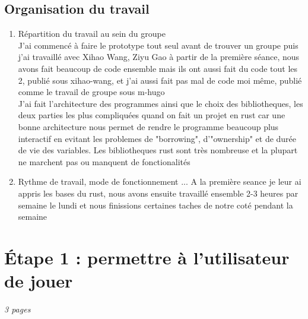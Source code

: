 \documentclass[a4paper]{article}
\begin{document}
\subsection{Organisation du travail}

\begin{enumerate}           %
\item
  Répartition du travail au sein du groupe\\
  J'ai commencé à faire le prototype tout seul avant de trouver un groupe puis j'ai travaillé avec Xihao Wang, Ziyu Gao à partir de la première séance, nous avons fait beaucoup de code ensemble mais ils ont aussi fait du code tout les 2, publié sous xihao-wang, et j'ai aussi fait pas mal de code moi même, publié comme le travail de groupe sous m-hugo\\
  J'ai fait l'architecture des programmes ainsi que le choix des bibliotheques, les deux parties les plus compliquées quand on fait un projet en rust car une bonne architecture nous permet de rendre le programme beaucoup plus interactif en evitant les problemes de "borrowing", d'"ownership" et de durée de vie des variables.
  Les bibliotheques rust sont très nombreuse et la plupart ne marchent pas ou manquent de fonctionalités 
\item
  Rythme de travail, mode de fonctionnement ...
  A la première seance je leur ai appris les bases du rust, nous avons ensuite travaillé ensemble 2-3 heures par semaine le lundi et nous finissions certaines taches de notre coté pendant la semaine
\end{enumerate}
\section{Étape 1 : permettre à l'utilisateur de jouer}

\emph{3 pages}
\end{document}
